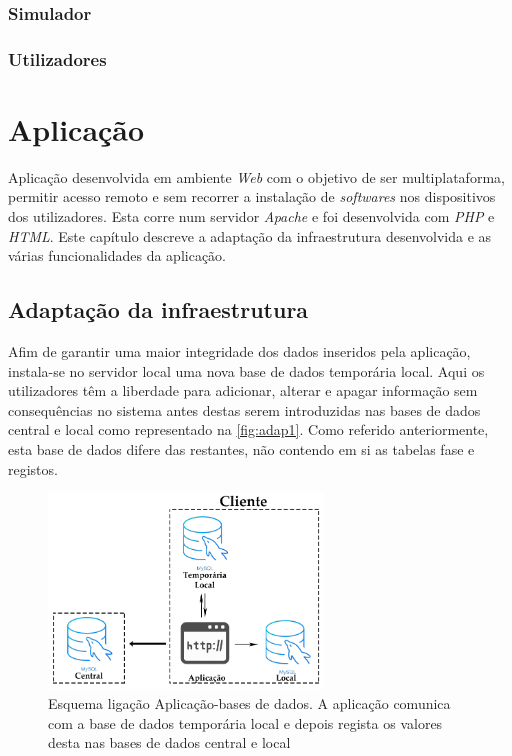\documentclass[11pt,twoside,a4paper]{report}
\begin{document}
\subsection{Simulador}

\subsection{Utilizadores}

\cleardoublepage
\chapter{Aplicação}
Aplicação desenvolvida em ambiente  \textit{Web} com o objetivo de ser multiplataforma, permitir acesso remoto e sem recorrer a instalação de \textit{softwares} nos dispositivos dos utilizadores. Esta corre num servidor \textit{Apache} e foi desenvolvida com \textit{PHP} e \textit{HTML}. Este capítulo descreve a adaptação da infraestrutura desenvolvida e as várias funcionalidades da aplicação.

\section{Adaptação da infraestrutura}
Afim de garantir uma maior integridade dos dados inseridos pela aplicação, instala-se no servidor local uma nova base de dados temporária local. Aqui os utilizadores têm a liberdade para adicionar, alterar e apagar informação sem consequências no sistema antes destas serem introduzidas nas bases de dados central e local como representado na \autoref{fig:adap1}. Como referido anteriormente, esta base de dados difere das restantes, não contendo em si as tabelas fase e registos.
\begin{figure}[H]
	\begin{center}
		\includegraphics[width=0.65\textwidth]{Aplicacao_temp_local_central} %
		\caption{Esquema ligação Aplicação-bases de dados. A aplicação comunica com a base de dados temporária local e depois regista os valores desta nas bases de dados central e local}
		\label{fig:adap1}
	\end{center}
\end{figure}
\end{document}
